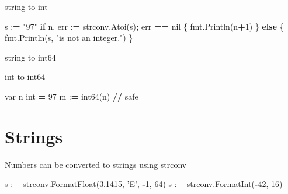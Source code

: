 \documentclass[]{book}
\newenvironment{Shaded}{\begin{snugshade}}{\end{snugshade}}
\newcommand{\DecValTok}[1]{\textcolor[rgb]{0.00,0.00,0.81}{#1}}
\newcommand{\FloatTok}[1]{\textcolor[rgb]{0.00,0.00,0.81}{#1}}
\newcommand{\SpecialCharTok}[1]{\textcolor[rgb]{0.00,0.00,0.00}{#1}}
\newcommand{\StringTok}[1]{\textcolor[rgb]{0.31,0.60,0.02}{#1}}
\newcommand{\ControlFlowTok}[1]{\textcolor[rgb]{0.13,0.29,0.53}{\textbf{#1}}}
\newcommand{\OperatorTok}[1]{\textcolor[rgb]{0.81,0.36,0.00}{\textbf{#1}}}
\newcommand{\BuiltInTok}[1]{#1}
\newcommand{\NormalTok}[1]{#1}
\begin{document}
string to int

\begin{Shaded}
\begin{Highlighting}[]
\NormalTok{s :}\OperatorTok{=} \StringTok{"97"}
\ControlFlowTok{if}\NormalTok{ n, err :}\OperatorTok{=}\NormalTok{ strconv.Atoi(s)}\OperatorTok{;}\NormalTok{ err }\OperatorTok{==}\NormalTok{ nil \{}
\NormalTok{    fmt.Println(n}\OperatorTok{+}\DecValTok{1}\NormalTok{)}
\NormalTok{\} }\ControlFlowTok{else}\NormalTok{ \{}
\NormalTok{    fmt.Println(s, }\StringTok{"is not an integer."}\NormalTok{)}
\NormalTok{\}}
\end{Highlighting}
\end{Shaded}

string to int64

\begin{Shaded}
\end{Shaded}

int to int64

\begin{Shaded}
\begin{Highlighting}[]
\NormalTok{var n }\BuiltInTok{int} \OperatorTok{=} \DecValTok{97}
\NormalTok{m :}\OperatorTok{=}\NormalTok{ int64(n) }\OperatorTok{//}\NormalTok{ safe}
\end{Highlighting}
\end{Shaded}

\section{Strings}\label{strings}

Numbers can be converted to strings using strconv

\begin{Shaded}
\begin{Highlighting}[]
\NormalTok{s :}\OperatorTok{=}\NormalTok{ strconv.FormatFloat(}\FloatTok{3.1415}\NormalTok{, }\StringTok{'E'}\NormalTok{, }\OperatorTok{-}\DecValTok{1}\NormalTok{, }\DecValTok{64}\NormalTok{)}
\NormalTok{s :}\OperatorTok{=}\NormalTok{ strconv.FormatInt(}\OperatorTok{-}\DecValTok{42}\NormalTok{, }\DecValTok{16}\NormalTok{)}
\end{Highlighting}
\end{Shaded}
\end{document}
